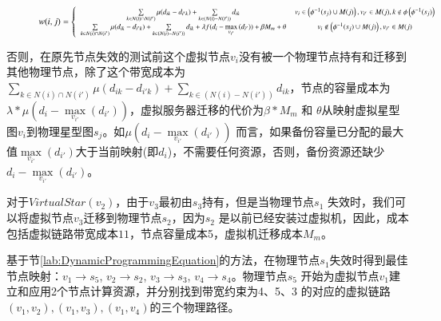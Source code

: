 \begin{figure}
  \centering
    \begin{equation}
  \footnotesize
w(i,j) = \left\{ {\begin{array}{*{20}{c}}
   {\sum\limits_{k \in N(i) \cap N(i')} {\mu({d_{ik}} - {d_{i'k}})}  + \sum\limits_{k \in \left( {N(i) - N(i')} \right)} {{d_{ik}}} } & {{v_i} \in \left( {{\phi ^{ - 1}}({s_j}) \cup M(j)} \right),{v_{i'}} \in M(j),k \notin \phi \left( {{\phi ^{ - 1}}({s_j})} \right)}  \\
   {\sum\limits_{k \in N(i) \cap N(i')} {\mu({d_{ik}} - {d_{i'k}})}  + \sum\limits_{k \in \left( {N(i) - N(i')} \right)} {{d_{ik}}}  + \lambda f({d_i} - \mathop {\max }\limits_{{v_{i'}}} \left( {{d_{i'}}} \right)) + \beta {M_m} + \theta } & {{v_i} \notin \left( {{\phi ^{ - 1}}({s_j}) \cup M(j)} \right),{v_{i'}} \in M(j)}  \\
\end{array}} \right.
    \label{eq:new edge weight}
    \end{equation}
\end{figure}

否则，在原先节点失效的测试前这个虚拟节点$v_i$没有被一个物理节点持有和迁移到其他物理节点，除了这个带宽成本为${\sum\limits_{k \in N(i) \cap N(i')} {\mu({d_{ik}} - {d_{i'k}})}  + \sum\limits_{k \in \left( {N(i) - N(i')} \right)} {{d_{ik}}} }$，节点的容量成本为${\lambda * \mu({d_i} - \mathop {\max }\limits_{{v_{i'}}} \left( {{d_{i'}}} \right))}$，虚拟服务器迁移的代价为${\beta * {M_m}}$ 和 $\theta$从映射虚拟星型图$v_i$到物理星型图$s_j$。如${\mu({d_i} - \mathop {\max }\limits_{{v_{i'}}} \left( {{d_{i'}}} \right))}$ 而言，如果备份容量已分配的最大值${\mathop {\max }\limits_{{v_{i'}}} \left( {{d_{i'}}} \right)}$大于当前映射(即$d_i$)，不需要任何资源，否则，备份资源还缺少${{d_i} - \mathop {\max }\limits_{{v_{i'}}} \left( {{d_{i'}}} \right)}$。

对于$VirtualStar(v_2)$，由于$v_3$最初由$s_3$持有，但是当物理节点$s_1$ 失效时，我们可以将虚拟节点$v_3$迁移到物理节点$s_2$，因为$s_2$ 是以前已经安装过虚拟机，因此，成本包括虚拟链路带宽成本$11$，节点容量成本5，虚拟机迁移成本$M_m$。

基于节\ref{lab:DynamicProgrammingEquation}的方法，在物理节点$s_1$失效时得到最佳节点映射：$v_1 \rightarrow s_5$, $v_2 \rightarrow s_2$, $v_3 \rightarrow s_3$, $v_4 \rightarrow s_4$。物理节点$s_5$ 开始为虚拟节点$v_1$建立和应用2个节点计算资源，并分别找到带宽约束为4、5、3 的对应的虚拟链路$(v_1,v_2),(v_1,v_3),(v_1,v_4)$的三个物理路径。

